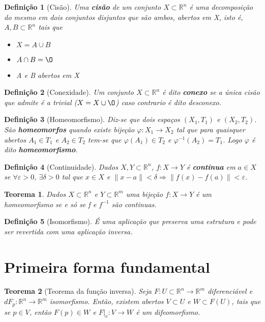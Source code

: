 \documentclass{article}
\newtheorem{theorem}{Teorema}
\newtheorem{definition}{Definição}
\begin{document}
\begin{definition}[Cisão]
Uma \textbf{cisão} de um conjunto $X \subset \mathbb{R}^n$ é uma decomposição do mesmo em dois conjuntos disjuntos que são ambos, abertos em X, isto é, $A, B \subset \mathbb{R}^n$ tais que

\begin{itemize}
    \item $X = A \cup B$
    
    \item $A \cap B = \O$
    
    \item A e B abertos em X
\end{itemize}
\end{definition}

\begin{definition}[Conexidade]
Um conjunto $X \subset \mathbb{R}^n$ é dito \textbf{conexo} se a única cisão que admite é a trivial ($X = X \cup \O$) caso contrario é dito desconexo.
\end{definition}

\begin{definition}[Homeomorfismo]
Diz-se que dois espaços $(X_1, T_1)$ e $(X_2, T_2)$. São \textbf{homeomorfos} quando existe bijeção $\varphi: X_1 \rightarrow X_2$ tal que para quaisquer abertos $A_1 \in T_1$ e $A_2 \in T_2$ tem-se que $\varphi(A_1) \in T_2$ e $\varphi^{-1}(A_2) = T_1$. Logo $\varphi$ é dito \textbf{homeomorfismo}.
\end{definition}

\begin{definition}[Continuidade]
Dados $X, Y \subset \mathbb{R}^n$, $f: X \rightarrow Y$ é \textbf{contínua} em $a \in X$ se $\forall \varepsilon > 0,\ \exists \delta > 0$ tal que $x \in X$ e $\| x - a \| < \delta \Rightarrow \| f(x) - f(a) \| < \varepsilon$.
\end{definition}

\begin{theorem}
Dados $X \subset \mathbb{R}^n$ e $Y \subset \mathbb{R}^m$ uma bijeção $f: X \rightarrow Y$ é um homeomorfismo se e só se f e $f^{-1}$ são continuas.
\end{theorem}

\begin{definition}[Isomorfismo]
É uma aplicação que preserva uma estrutura e pode ser revertida com uma aplicação inversa.
\end{definition}

\section*{Primeira forma fundamental}
\label{s11}
\begin{theorem}[Teorema da função inversa]
Seja $F: U \subset \mathbb{R}^n \rightarrow \mathbb{R}^m$ diferenciável e $dF_p : \mathbb{R}^n \rightarrow \mathbb{R}^m$ isomorfismo. Então, existem abertos $V \subset U$ e $W \subset F(U)$, tais que se $p \in V$, então $F(p) \in W$ e $F|_v : V \rightarrow W$ é um difeomorfismo.
\end{theorem}
\end{document}
